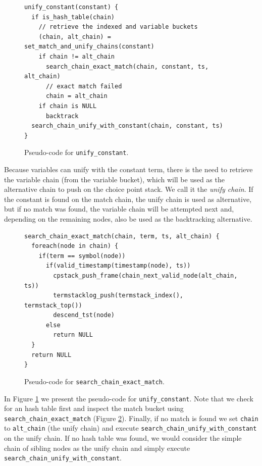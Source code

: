 \begin{figure}[ht]
\begin{Verbatim}
unify_constant(constant) {
  if is_hash_table(chain)
    // retrieve the indexed and variable buckets
    (chain, alt_chain) = set_match_and_unify_chains(constant)
    if chain != alt_chain
      search_chain_exact_match(chain, constant, ts, alt_chain)
      // exact match failed
      chain = alt_chain
    if chain is NULL
      backtrack
  search_chain_unify_with_constant(chain, constant, ts)
}
\end{Verbatim}
\caption{Pseudo-code for \texttt{unify\_constant}.}
\label{fig:unify_constant}
\end{figure}

Because variables can unify with the constant term, there is the need to retrieve the variable chain (from the variable bucket), which will be used as the alternative chain to push on the choice point stack. We call it the \textit{unify chain}. If the constant is found on the match chain, the unify chain is used as alternative, but if no match was found, the variable chain will be attempted next and, depending on the remaining nodes, also be used as the backtracking alternative.

\begin{figure}[ht]
\begin{Verbatim}
search_chain_exact_match(chain, term, ts, alt_chain) {
  foreach(node in chain) {
    if(term == symbol(node))
      if(valid_timestamp(timestamp(node), ts))
        cpstack_push_frame(chain_next_valid_node(alt_chain, ts))
        termstacklog_push(termstack_index(), termstack_top())
        descend_tst(node)
      else
        return NULL
  }
  return NULL
}
\end{Verbatim}
\caption{Pseudo-code for \texttt{search\_chain\_exact\_match}.}
\label{fig:search_chain_exact_match}
\end{figure}

In Figure \ref{fig:unify_constant} we present the pseudo-code for \texttt{unify\_constant}. Note that we check for an hash table first and inspect the match bucket using \texttt{search\_chain\_exact\_match} (Figure \ref{fig:search_chain_exact_match}).
Finally, if no match is found we set \texttt{chain} to \texttt{alt\_chain} (the unify chain) and execute \texttt{search\_chain\_unify\_with\_constant} on the unify chain. If no hash table was found, we would consider the simple chain of sibling nodes as the unify chain and simply execute \texttt{search\_chain\_unify\_with\_constant}.

